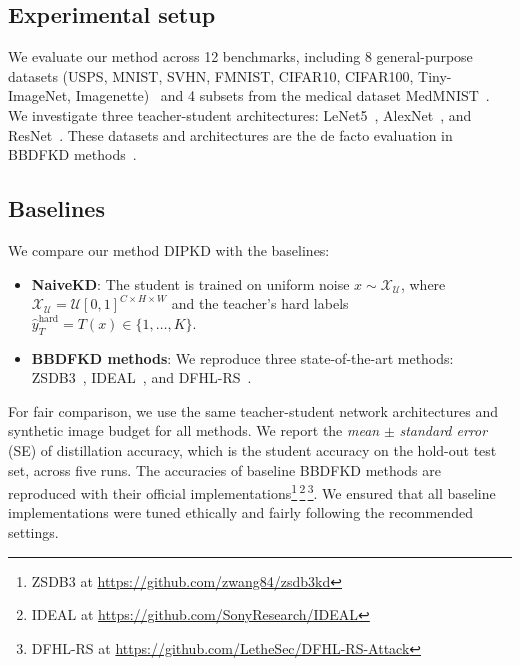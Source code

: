 \documentclass[12pt, a4paper, twoside]{book}
\numberwithin{equation}{chapter}
\theoremstyle{plain}
\theoremstyle{definition}
\theoremstyle{remark}
\newenvironment{foldable}{}{}
\begin{document}
\subsection{Experimental setup} \label{sec:44-research02-experiments-setup}
\begin{foldable} We evaluate our method across 12 benchmarks, including 8 general-purpose datasets (USPS, MNIST, SVHN, FMNIST, CIFAR10, CIFAR100, Tiny-ImageNet, Imagenette)~\cite{lecun1998gradient,hull1994database,netzer2011reading,xiao2017fashion,krizhevsky2009learning,le2015tiny,howard2020imagenette} and 4 subsets from the medical dataset MedMNIST~\cite{yang2021medmnist}.
  We investigate three teacher-student architectures: LeNet5~\cite{lecun1998gradient}, AlexNet~\cite{krizhevsky2012imagenet}, and ResNet~\cite{he2016deep}.
  These datasets and architectures are the de facto evaluation in BBDFKD methods~\cite{wang2021zero, zhang2022ideal, yuan2024data}.
\end{foldable}

\subsection{Baselines} \label{sec:44-research02-experiments-baselines}
\begin{foldable} We compare our method \ac{DIPKD} with the baselines:
  \begin{itemize}
    \item \textbf{NaiveKD}: The student is trained on uniform noise $x \sim \mathcal{X}_\mathcal{U}$, where $\mathcal{X}_\mathcal{U}=\mathcal{U}[0,1]^{C \times H \times W}$ and the teacher's hard labels $\hat{y}_{T}^\text{hard} = T(x) \in \{1, \ldots, K\}$.
    \item \textbf{BBDFKD methods}: We reproduce three state-of-the-art methods: ZSDB3~\cite{wang2021zero}, IDEAL~\cite{zhang2022ideal}, and DFHL-RS~\cite{yuan2024data}.
  \end{itemize}
  For fair comparison, we use the same teacher-student network architectures and synthetic image budget for all methods.
  We report the \textit{mean} $\pm$ \textit{standard error} (SE) of distillation accuracy, which is the student accuracy on the hold-out test set, across five runs.
  The accuracies of baseline BBDFKD methods are reproduced with their official implementations\footnote{ZSDB3 at \url{https://github.com/zwang84/zsdb3kd}}\,\footnote{IDEAL at \url{https://github.com/SonyResearch/IDEAL}}\,\footnote{DFHL-RS at \url{https://github.com/LetheSec/DFHL-RS-Attack}}.
  We ensured that all baseline implementations were tuned ethically and fairly following the recommended settings.
\end{foldable}
\end{document}
